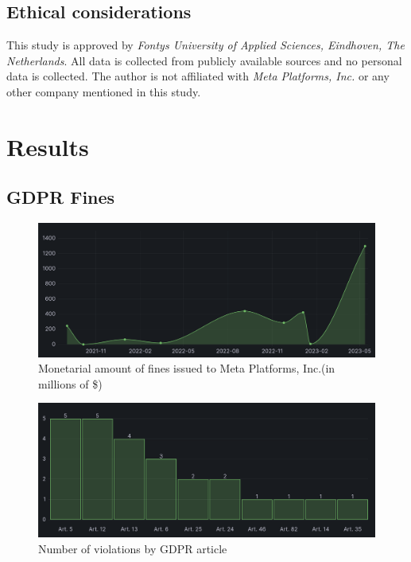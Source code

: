 \documentclass[12pt, a4paper]{article}
\begin{document}
\subsection*{Ethical considerations}

This study is approved by \textit{Fontys University of Applied Sciences,
Eindhoven, The Netherlands}. All data is collected from publicly available
sources and no personal data is collected. The author is not affiliated with
\textit{Meta Platforms, Inc.} or any other company mentioned in this study.

\section*{Results}

\subsection*{GDPR Fines}

\begin{figure}[H]
    \centering
    \includegraphics[width=1.00\textwidth]{monetarial-amount-of-gdpr-fines}
    \caption{Monetarial amount of fines issued to Meta Platforms, Inc.(in
    millions of
    \$)\cite{gdprFine1,gdprFine2,gdprFine3,gdprFine4,gdprFine5,gdprFine6,gdprFine7,gdprFine8,gdprFine9}}
    \label{fig:amount-of-gdpr-fines}
\end{figure}

\begin{figure}[H]
    \centering
    \includegraphics[width=1.00\textwidth]{violations-by-article}
    \caption{Number of violations by GDPR
    article\cite{gdprFine1,gdprFine2,gdprFine3,gdprFine4,gdprFine5,gdprFine6,gdprFine7,gdprFine8,gdprFine9}}
    \label{fig:violations-by-article}
\end{figure}
\end{document}
